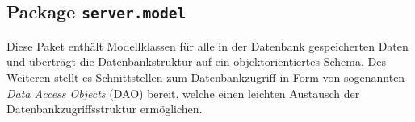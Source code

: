  \FloatBarrier
 \subsection[Package server.model]{Package \texttt{server.model}}
Diese Paket enthält Modellklassen für alle in der Datenbank gespeicherten Daten und überträgt die Datenbankstruktur auf ein objektorientiertes Schema. Des Weiteren stellt es Schnittstellen zum Datenbankzugriff in Form von sogenannten \emph{Data Access Objects} (DAO) bereit, welche einen leichten Austausch der Datenbankzugriffsstruktur ermöglichen.


 
